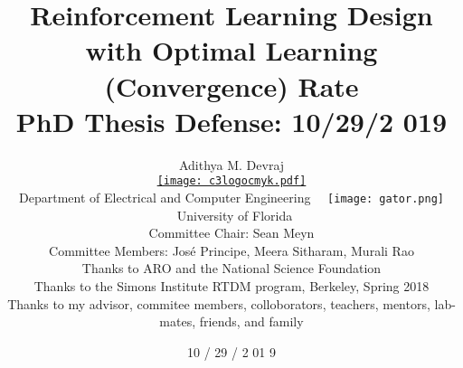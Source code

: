 \documentclass[xcolor=dvipsnames, subsection=false]{beamer}
\def\alertb#1{\alert{\color{BrickRed}  #1}}
\def\alertc#1{\alert{\color{MyDarkBlue}  #1}}
\def\alertb#1{\alert{\color{BrickRed}  #1}}
\def\alertc#1{\alert{\color{MyDarkBlue}  #1}}
\begin{document}
 


\thispagestyle{empty}
\setcounter{page}{0}





  \title{ 
\alertb{\Large Reinforcement Learning Design}
\\ 
\alert{\Large  with Optimal Learning {\alertc{(Convergence)}} Rate}
\vspace{0.4em}
\\
\alertc{\small PhD Thesis Defense: {\alertc{10}/\alert{29}/\alert{2}\alertc{01}\alert{9}}}
\\[-.5em]
}

 
 
 
    
\author{\alertc{\small Adithya M. Devraj}
\\[.2cm]
\href{http://ccc.centers.ufl.edu/}{\texttt{[image: c3logocmyk.pdf]}}
\\[.15cm] {\scriptsize 
\alertc{Department of Electrical and Computer Engineering 
\ 
 \lower3.0pt\hbox{ \texttt{[image: gator.png]}}
\ 
University of Florida}}
\small 
\\[.3cm]
\alert{
Committee Chair: Sean Meyn}
 \\[.25cm]
\alert{ Committee Members: Jos\'e Principe, Meera Sitharam, Murali Rao}
\\[.45cm]
\alertc{\tiny
Thanks to   ARO and the National Science Foundation}
\\[.05cm]
\alertc{\tiny
Thanks to the Simons Institute RTDM program, Berkeley, Spring 2018}
\\[.05cm]
\alertc{\tiny
Thanks to my advisor, commitee members, colloborators, teachers, mentors, lab-mates, friends, and family}
}
\date{\vspace{-1.5cm}\small  \alertc{10} / \alert{29} / \alert{2} \alertc{01} \alert{9}}






\frame{\titlepage
\setcounter{framenumber}{0}
}
\end{document}
